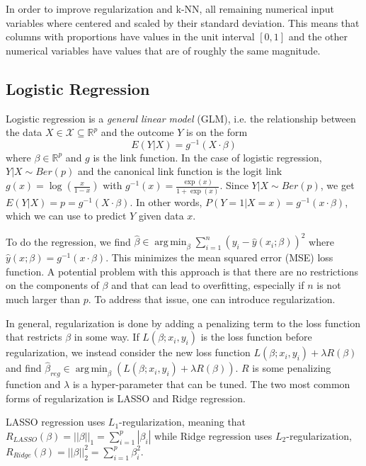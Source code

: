 \documentclass{article}
\DeclareMathOperator*{\argmin}{arg\,min}
\begin{document}
In order to improve regularization and k-NN, all remaining numerical input variables where centered and scaled by their standard deviation. This means that columns with proportions have values in the unit interval $[0,1]$ and the other numerical variables have values that are of roughly the same magnitude.

\subsection{Logistic Regression}
Logistic regression is a \textit{general linear model} (GLM), i.e. the relationship between the data $X \in \mathcal{X} \subseteq \mathbb{R}^p$ and the outcome $Y$ is on the form
\begin{equation}
	E(Y|X) = g^{-1}(X \cdot \beta)
\end{equation}
where $\beta \in \mathbb{R}^p$ and $g$ is the link function. In the case of logistic regression, $Y|X \sim Ber(p)$ and the canonical link function is the logit link $g(x) = \log \left( \frac{x}{1 - x} \right)$ with $g^{-1}(x) = \frac{\exp(x)}{1 + \exp(x)}$. Since $Y|X \sim Ber(p)$, we get $E(Y|X) = p = g^{-1}(X \cdot \beta)$. In other words, $P(Y = 1 | X = x) = g^{-1}(x \cdot \beta)$, which we can use to predict $Y$ given data $x$.

To do the regression, we find $\hat \beta \in \argmin_\beta \sum_{i=1}^{n} (y_i - \hat y(x_i; \beta))^2$ where $\hat y(x;\beta) = g^{-1} (x \cdot \beta)$. This minimizes the mean squared error (MSE) loss function. A potential problem with this approach is that there are no restrictions on the components of $\beta$ and that can lead to overfitting, especially if $n$ is not much larger than $p$. To address that issue, one can introduce regularization.

In general, regularization is done by adding a penalizing term to the loss function that restricts $\beta$ in some way. If $L(\beta; x_i,y_i)$ is the loss function before regularization, we instead consider the new loss function $L(\beta; x_i,y_i) + \lambda R(\beta)$ and find $\hat \beta_{reg} \in \argmin_\beta \left( L(\beta; x_i, y_i) + \lambda R(\beta) \right)$. $R$ is some penalizing function and $\lambda$ is a hyper-parameter that can be tuned. The two most common forms of regularization is LASSO and Ridge regression.

LASSO regression uses $L_1$-regularization, meaning that $R_{LASSO}(\beta) = ||\beta||_1 =  \sum_{i=1}^{p} |\beta_i|$ while Ridge regression uses $L_2$-regularization, $R_{Ridge}(\beta) = ||\beta||_2^2 = \sum_{i=1}^{p} \beta_i^2$.
\end{document}
